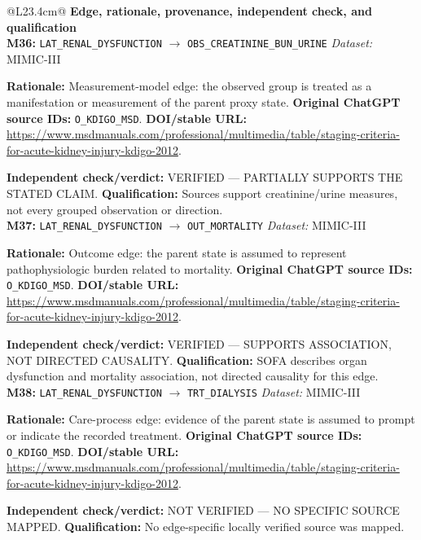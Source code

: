 \begin{tabular}{@{}L{23.4cm}@{}}
\toprule
\textbf{Edge, rationale, provenance, independent check, and qualification}\\
\midrule
\textbf{M36:} \nolinkurl{LAT_RENAL_DYSFUNCTION} $\rightarrow$ \nolinkurl{OBS_CREATININE_BUN_URINE} \hfill \textit{Dataset:} MIMIC-III\par\textbf{Rationale:} Measurement-model edge: the observed group is treated as a manifestation or measurement of the parent proxy state. \textbf{Original ChatGPT source IDs:} \nolinkurl{O_KDIGO_MSD}. \textbf{DOI/stable URL:} \url{https://www.msdmanuals.com/professional/multimedia/table/staging-criteria-for-acute-kidney-injury-kdigo-2012}.\par\textbf{Independent check/verdict:} VERIFIED --- PARTIALLY SUPPORTS THE STATED CLAIM. \textbf{Qualification:} Sources support creatinine/urine measures, not every grouped observation or direction. \\
\addlinespace[2pt]
\midrule
\textbf{M37:} \nolinkurl{LAT_RENAL_DYSFUNCTION} $\rightarrow$ \nolinkurl{OUT_MORTALITY} \hfill \textit{Dataset:} MIMIC-III\par\textbf{Rationale:} Outcome edge: the parent state is assumed to represent pathophysiologic burden related to mortality. \textbf{Original ChatGPT source IDs:} \nolinkurl{O_KDIGO_MSD}. \textbf{DOI/stable URL:} \url{https://www.msdmanuals.com/professional/multimedia/table/staging-criteria-for-acute-kidney-injury-kdigo-2012}.\par\textbf{Independent check/verdict:} VERIFIED --- SUPPORTS ASSOCIATION, NOT DIRECTED CAUSALITY. \textbf{Qualification:} SOFA describes organ dysfunction and mortality association, not directed causality for this edge. \\
\addlinespace[2pt]
\midrule
\textbf{M38:} \nolinkurl{LAT_RENAL_DYSFUNCTION} $\rightarrow$ \nolinkurl{TRT_DIALYSIS} \hfill \textit{Dataset:} MIMIC-III\par\textbf{Rationale:} Care-process edge: evidence of the parent state is assumed to prompt or indicate the recorded treatment. \textbf{Original ChatGPT source IDs:} \nolinkurl{O_KDIGO_MSD}. \textbf{DOI/stable URL:} \url{https://www.msdmanuals.com/professional/multimedia/table/staging-criteria-for-acute-kidney-injury-kdigo-2012}.\par\textbf{Independent check/verdict:} NOT VERIFIED --- NO SPECIFIC SOURCE MAPPED. \textbf{Qualification:} No edge-specific locally verified source was mapped. \\
\addlinespace[2pt]

\end{tabular}
